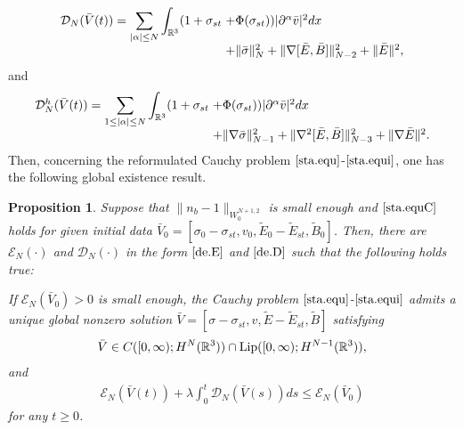 \documentclass[11pt]{amsart}
\newtheorem{proposition}{Proposition}[section]
\numberwithin{equation}{section}
\begin{document}
\begin{eqnarray}\label{de.D}
\arraycolsep=1.5pt
\begin{array}{rl}
\mathcal {D}_{N}(\bar{V}(t))=\displaystyle \sum_{|\alpha|\leq
N}\int_{\mathbb{R}^3}(1+\sigma_{st}&+\Phi(\sigma_{st}))|\partial^{\alpha}\bar{v}|^{2}dx\\[3mm]
&+\|\bar{\sigma}\|_{N}^{2}+\|\nabla[\bar{E},\bar{B}]\|_{N-2}^{2}+\|\bar{E}\|^{2},
\end{array}
\end{eqnarray}
and
\begin{eqnarray}\label{de.Dh}
\arraycolsep=1.5pt
\begin{array}{rl}
\mathcal {D}_{N}^{h}(\bar{V}(t))=\displaystyle
\sum_{1\leq|\alpha|\leq
N}\int_{\mathbb{R}^3}(1+\sigma_{st}&+\Phi(\sigma_{st}))|\partial^{\alpha}\bar{v}|^{2}dx\\[3mm]
&+\|\nabla\bar{\sigma}\|_{N-1}^{2}+\|\nabla^2[\bar{E},\bar{B}]\|_{N-3}^{2}+\|\nabla\bar{E}\|^{2}.
\end{array}
\end{eqnarray}
Then, concerning the reformulated Cauchy problem
$\eqref{sta.equ}$-$\eqref{sta.equi}$, one has the following global
existence result.

\begin{proposition}\label{pro.2.1}
Suppose that $\|n_{b}-1\|_{W_{0}^{N+1,2}}$ is small enough and
$\eqref{sta.equC}$ holds for given initial data
$\bar{V}_{0}=[\sigma_{0}-\sigma_{st},v_{0},\tilde{E}_0-\tilde{E}_{st},\tilde{B}_{0}]$.
Then, there are $\mathcal {E}_{N}(\cdot) $ and $\mathcal
{D}_{N}(\cdot)$ in the form $\eqref{de.E} $ and $\eqref{de.D}$ such
that the following holds true:

If $\mathcal {E}_{N}(\bar{V}_{0})>0$ is small enough,  the Cauchy
problem $\eqref{sta.equ}$-$\eqref{sta.equi}$ admits a unique global
nonzero solution
$\bar{V}=[\sigma-\sigma_{st},v,\tilde{E}-\tilde{E}_{st},\tilde{B}] $
satisfying
\begin{eqnarray}\label{V.satisfy}
\bar{V} \in C([0,\infty);H^{N}(\mathbb{R}^{3}))\cap {\rm
Lip}([0,\infty);H^{N-1}(\mathbb{R}^{3})),
\end{eqnarray}
and
\begin{eqnarray}\label{pro.2.1j}
\mathcal {E}_{N}(\bar{V}(t))+\lambda\int_{0}^{t}\mathcal
{D}_{N}(\bar{V}(s))ds\leq \mathcal {E}_{N}(\bar{V}_{0})
\end{eqnarray}
for any $t\geq 0$.
\end{proposition}
\end{document}
